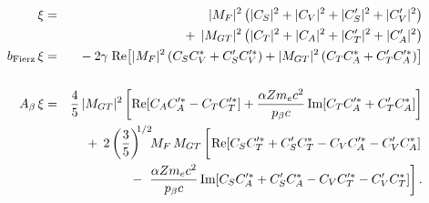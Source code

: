 %
%
%
\begin{eqnarray}
    \xi &=& 
    	|M_F|^2    \left( |C_S|^2 + |C_V|^2 + |C_S^\prime|^2 + |C_V^\prime|^2 \right) 
		\nonumber \\ && + \;\,
		|M_{GT}|^2 \left( |C_T|^2 + |C_A|^2 + |C_T^\prime|^2 + |C_A^\prime|^2 \right)
		\label{eq:jtw_xi_integrated} \\
    \bFierz \, \xi &=& 
    	- \: 2 \gamma \;
		\textrm{Re}\!\left[ |M_F|^2 \left( C_S C_V^* + C_S^\prime C_V^{\prime *} \right) 
    	+ |M_{GT}|^2 \left( C_T C_A^* + C_T^{\prime} C_A^{\prime *} \right) \right] 
		\nonumber \\
    	\label{eq:jtw_bxi_integrated} \\
    \Abeta \, \xi &=& 
    	\frac{4}{5} \, |M_{GT}|^2 \left[ \textrm{Re}\!\left[ C_A C_A^{\prime *} - C_T C_T^{\prime *} \right] + \frac{\alpha Z \me c^2}{\pbeta c} \,\textrm{Im}\!\left[ C_T C_A^{\prime *} + C_T^\prime C_A^* \right] \right] 
		\nonumber \\ && + \;\, 
		2 %
		\left( \frac{3}{5} \right)^{\!\! 1/2} \!\!
		M_F\,M_{GT}  \left[ \phantom{\frac{1}{1}\!\!\!\!} \textrm{Re} \! \left[ C_S C_T^{\prime *} +  C_S^\prime C_T^* - C_V C_A^{\prime *} - C_V^\prime C_A^* \right] 
		\right.
		\nonumber \\ && - \;
		\left.
		\frac{\alpha Z \me c^2}{\pbeta c} \,\textrm{Im}\!\left[ C_S C_A^{\prime *} + C_S^\prime C_A^* - C_V C_T^{\prime *} -C_V^\prime C_T^* \right] \right].
	\label{eq:jtw_Abetaxi_integrated}
\end{eqnarray}
%
%
